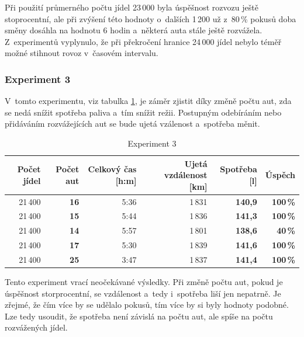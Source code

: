 \documentclass[a4paper, 11pt]{article}
\begin{document}
	Při použití průmerného počtu jídel 23\,000 byla úspěšnost rozvozu ještě
	stoprocentní, ale při zvýšení této hodnoty o~dalších 1\,200 už z~80\,\%
	pokusů doba směny dosáhla na hodnotu 6 hodin a~některá auta stále ještě
	rozvážela. Z~experimentů vyplynulo, že při překročení hranice 24\,000 jídel
	nebylo téměř možné stihnout rovoz v~časovém intervalu.

	\subsubsection{Experiment 3}

	V~tomto experimentu, viz tabulka \ref{table:experiment3}, je záměr
	zjistit díky změně počtu aut, zda se nedá snížit spotřeba paliva a~tím
	snížit režii. Postupným odebíráním nebo přidáváním rozvážejících aut se
	bude ujetá vzálenost a~spotřeba měnit.

	\begin{table}[ht]
		\centering
		\begin{tabular}{|r|r|r|r|r|r|}
			\hline
			Počet jídel & \textbf{Počet aut} & Celkový čas [h:m]
				& Ujetá vzdálenost [km] & \textbf{Spotřeba [l]}
				& \textbf{Úspěch} \\ \hline

			21\,400 & \textbf{16} & 5:36 & 1\,831 & \textbf{140,9}
				& \textbf{100\,\%} \\ \hline

			21\,400 & \textbf{15} & 5:44 & 1\,836 & \textbf{141,3}
				& \textbf{100\,\%} \\ \hline

			21\,400 & \textbf{14} & 5:57 & 1\,801 & \textbf{138,6}
				& \textbf{40\,\%}  \\ \hline

			21\,400 & \textbf{17} & 5:30 & 1\,839 & \textbf{141,6}
				& \textbf{100\,\%} \\ \hline

			21\,400 & \textbf{25} & 3:47 & 1\,837 & \textbf{141,4}
				& \textbf{100\,\%} \\ \hline
		\end{tabular}

		\caption{Experiment 3}
		\label{table:experiment3}
	\end{table}

	Tento experiment vrací neočekávané výsledky. Při změně počtu aut, pokud je
	úspěšnost storprocentní, se vzdálenost a~tedy i~spotřeba liší jen nepatrně.
	Je zřejmé, že čím více by se udělalo pokusů, tím více by si byly hodnoty
	podobné. Lze tedy usoudit, že spotřeba není závislá na počtu aut, ale
	spíše na počtu rozvážených jídel.
\end{document}
